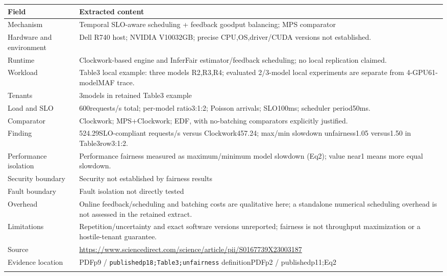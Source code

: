 \cite{P018}

\begin{longtable}{>{\raggedright\arraybackslash}p{}>{\raggedright\arraybackslash}p{}}
\toprule
\textbf{Field} & \textbf{Extracted content}\\\midrule\endhead
Mechanism & Temporal SLO-aware scheduling + feedback goodput balancing; MPS comparator\\\addlinespace
Hardware and environment & Dell R740 host; NVIDIA V10032GB; precise CPU,OS,driver/CUDA versions not established.\\\addlinespace
Runtime & Clockwork-based engine and InferFair estimator/feedback scheduling; no local replication claimed.\\\addlinespace
Workload & Table3 local example: three models R2,R3,R4; evaluated 2/3-model local experiments are separate from 4-GPU61-modelMAF trace.\\\addlinespace
Tenants & 3models in retained Table3 example\\\addlinespace
Load and SLO & 600requests/s total; per-model ratio3:1:2; Poisson arrivals; SLO100ms; scheduler period50ms.\\\addlinespace
Comparator & Clockwork; MPS+Clockwork; EDF, with no-batching comparators explicitly justified.\\\addlinespace
Finding & 524.29SLO-compliant requests/s versus Clockwork457.24; max/min slowdown unfairness1.05 versus1.50 in Table3row3:1:2.\\\addlinespace
Performance isolation & Performance fairness measured as maximum/minimum model slowdown (Eq2); value near1 means more equal slowdown.\\\addlinespace
Security boundary & Security not established by fairness results\\\addlinespace
Fault boundary & Fault isolation not directly tested\\\addlinespace
Overhead & Online feedback/scheduling and batching costs are qualitative here; a standalone numerical scheduling overhead is not assessed in the retained extract.\\\addlinespace
Limitations & Repetition/uncertainty and exact software versions unreported; fairness is not throughput maximization or a hostile-tenant guarantee.\\\addlinespace
Source & \url{https://www.sciencedirect.com/science/article/pii/S0167739X23003187}\\\addlinespace
Evidence location & PDFp9 / \nolinkurl{publishedp18;Table3;unfairness} definitionPDFp2 / publishedp11;Eq2\\\addlinespace
\bottomrule\end{longtable}

